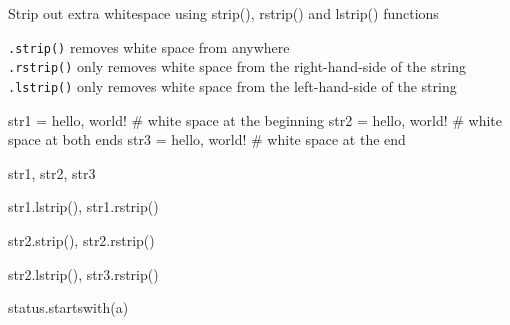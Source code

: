 \documentclass[
  letterpaper,
  DIV=11,
  numbers=noendperiod]{scrreprt}
\newenvironment{Shaded}{\begin{snugshade}}{\end{snugshade}}
\newcommand{\CommentTok}[1]{\textcolor[rgb]{0.37,0.37,0.37}{#1}}
\newcommand{\NormalTok}[1]{\textcolor[rgb]{0.00,0.23,0.31}{#1}}
\newcommand{\OperatorTok}[1]{\textcolor[rgb]{0.37,0.37,0.37}{#1}}
\newcommand{\StringTok}[1]{\textcolor[rgb]{0.13,0.47,0.30}{#1}}
\begin{document}
Strip out extra whitespace using strip(), rstrip() and lstrip()
functions

\texttt{.strip()} removes white space from anywhere\\
\texttt{.rstrip()} only removes white space from the right-hand-side of
the string\\
\texttt{.lstrip()} only removes white space from the left-hand-side of
the string

\begin{Shaded}
\begin{Highlighting}[]
\NormalTok{str1 }\OperatorTok{=} \StringTok{\textquotesingle{}  hello, world!\textquotesingle{}}    \CommentTok{\# white space at the beginning}
\NormalTok{str2 }\OperatorTok{=} \StringTok{\textquotesingle{}  hello, world!  \textquotesingle{}}  \CommentTok{\# white space at both ends}
\NormalTok{str3 }\OperatorTok{=} \StringTok{\textquotesingle{}hello, world!  \textquotesingle{}}    \CommentTok{\# white space at the end}
\end{Highlighting}
\end{Shaded}

\begin{Shaded}
\begin{Highlighting}[]
\NormalTok{str1, str2, str3}
\end{Highlighting}
\end{Shaded}

\begin{Shaded}
\begin{Highlighting}[]
\NormalTok{str1.lstrip(), str1.rstrip()}
\end{Highlighting}
\end{Shaded}

\begin{Shaded}
\begin{Highlighting}[]
\NormalTok{str2.strip(), str2.rstrip()}
\end{Highlighting}
\end{Shaded}

\begin{Shaded}
\begin{Highlighting}[]
\NormalTok{str2.lstrip(), str3.rstrip()}
\end{Highlighting}
\end{Shaded}

\begin{Shaded}
\begin{Highlighting}[]
\NormalTok{status.startswith(}\StringTok{\textquotesingle{}a\textquotesingle{}}\NormalTok{)}
\end{Highlighting}
\end{Shaded}
\end{document}
